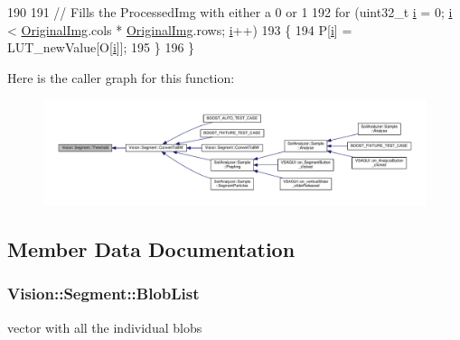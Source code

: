 \begin{DoxyCode}
190 
191         \textcolor{comment}{// Fills the ProcessedImg with either a 0 or 1}
192         \textcolor{keywordflow}{for} (uint32\_t \hyperlink{_comparision_pictures_2_createtest_image_8m_a6f6ccfcf58b31cb6412107d9d5281426}{i} = 0; \hyperlink{_comparision_pictures_2_createtest_image_8m_a6f6ccfcf58b31cb6412107d9d5281426}{i} < \hyperlink{class_vision_1_1_image_processing_a77c370dab270158a4e9c634e2d3f48e7}{OriginalImg}.cols * \hyperlink{class_vision_1_1_image_processing_a77c370dab270158a4e9c634e2d3f48e7}{OriginalImg}.rows; 
      \hyperlink{_comparision_pictures_2_createtest_image_8m_a6f6ccfcf58b31cb6412107d9d5281426}{i}++)
193         \{
194             P[\hyperlink{_comparision_pictures_2_createtest_image_8m_a6f6ccfcf58b31cb6412107d9d5281426}{i}] = LUT\_newValue[O[\hyperlink{_comparision_pictures_2_createtest_image_8m_a6f6ccfcf58b31cb6412107d9d5281426}{i}]];
195         \}
196     \}
\end{DoxyCode}


Here is the caller graph for this function\+:\nopagebreak
\begin{figure}[H]
\begin{center}
\leavevmode
\includegraphics[width=350pt]{class_vision_1_1_segment_a1d486dd3b67e1e1208c9ca04be8f6659_icgraph}
\end{center}
\end{figure}




\subsection{Member Data Documentation}
\hypertarget{class_vision_1_1_segment_a74e0600a7dd49bd7110ee27bb4cd6e0e}{}
\subsubsection[{Blob\+List}]{ Vision\+::\+Segment\+::\+Blob\+List}\label{class_vision_1_1_segment_a74e0600a7dd49bd7110ee27bb4cd6e0e}
vector with all the individual blobs 

